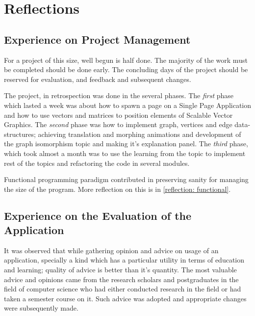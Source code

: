 
\section{Reflections}


\subsection{Experience on Project Management}
For a project of this size, well begun is half done. The majority of the work
must be completed should be done early. The concluding days of the project
should be reserved for evaluation, and feedback and subsequent changes.

The project, in retrospection was done in the several phases. The
\emph{first} phase which lasted a week was about how to spawn a page on a
Single Page Application and how to use vectors and matrices to position
elements of Scalable Vector Graphics. The \emph{second} phase was how to
implement graph, vertices and edge data-structures; achieving translation and
morphing animations and development of the graph isomorphism topic and making
it's explanation panel. The \emph{third} phase, which took almost a month was
to use the learning from the topic to implement rest of the topics and
refactoring the code in several modules.


Functional programming paradigm contributed in preserving sanity for managing
the size of the program. More reflection on this is in \autoref{reflection:
functional}. 

\subsection{Experience on the Evaluation of the Application}
It was observed that while gathering opinion and advice on usage of an
application, specially a kind which has a particular utility in terms of
education and learning; quality of advice is better than it's quantity. The most
valuable advice and opinions came from the research scholars and postgraduates
in the field of computer science who had either conducted research in the field
or had taken a semester course on it. Such advice was adopted and appropriate
changes were subsequently made.


